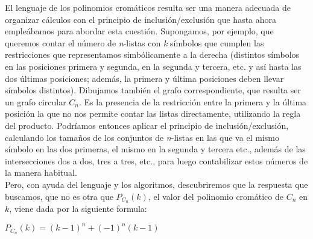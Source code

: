 \documentclass[12pt]{report}
\begin{document}
El lenguaje de los polinomios cromáticos resulta ser una manera adecuada de organizar cálculos con el principio de inclusión/exclusión que hasta ahora empleábamos para abordar esta cuestión. Supongamos, por ejemplo, que queremos contar el número de \textit{n}-listas con \textit{k} símbolos que cumplen las restricciones que representamos simbólicamente a la derecha (distintos símbolos en las posiciones primera y segunda, en la segunda y tercera, etc. y así hasta las dos últimas posiciones; además, la primera y última posiciones deben llevar símbolos distintos). Dibujamos también el grafo correspondiente, que resulta ser un grafo circular $C_n$. Es la presencia de la restricción entre la primera y la última posición la que no nos permite contar las listas directamente, utilizando la regla del producto. Podríamos entonces aplicar el principio de inclusión/exclusión, calculando los tamaños de los conjuntos de \textit{n}-listas en las que va el mismo símbolo en las dos primeras, el mismo en la segunda y tercera etc., además de las intersecciones dos a dos, tres a tres, etc., para luego contabilizar estos números de la manera habitual.\\
Pero, con ayuda del lenguaje y los algoritmos, descubriremos que la respuesta que buscamos, que no es otra que $P_{C_n}(k)$, el valor del polinomio cromático de $C_n$ en $k$, viene dada por la siguiente formula:
\begin{center}
$P_{C_n}(k)= ( k - 1 )^n + (-1)^n ( k - 1 )$
\end{center}
\end{document}
